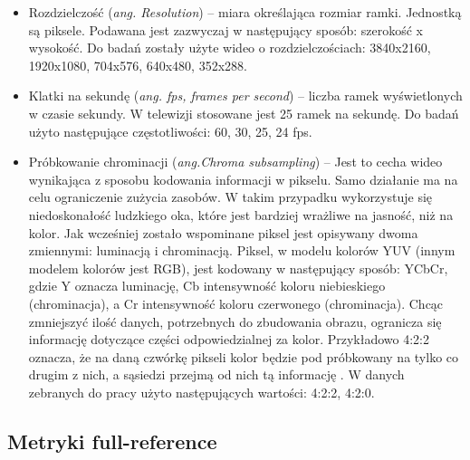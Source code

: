 \begin{itemize}[label=$\bullet$]
\item Rozdzielczość ({\em ang.  Resolution}) -- miara określająca rozmiar ramki. Jednostką są piksele. Podawana jest zazwyczaj w następujący sposób: szerokość x wysokość. Do badań zostały użyte wideo o rozdzielczościach: 3840x2160, 1920x1080, 704x576, 640x480, 352x288. 
\item Klatki na sekundę ({\em ang. fps, frames per second}) -- liczba ramek wyświetlonych w czasie sekundy. W telewizji stosowane jest 25 ramek na sekundę. Do badań użyto następujące częstotliwości: 60, 30, 25, 24 fps.
\item Próbkowanie chrominacji  ({\em ang.Chroma subsampling}) -- Jest to cecha  wideo wynikająca z sposobu kodowania  informacji w pikselu.  Samo działanie ma na celu  ograniczenie zużycia zasobów.  W takim przypadku wykorzystuje się  niedoskonałość ludzkiego oka, które jest bardziej wrażliwe na jasność, niż na kolor. Jak wcześniej zostało wspominane piksel jest opisywany dwoma zmiennymi: luminacją i chrominacją. Piksel, w modelu kolorów YUV (innym modelem kolorów jest RGB),  jest  kodowany w następujący sposób: YCbCr, gdzie Y oznacza luminację, Cb intensywność koloru niebieskiego (chrominacja), a Cr intensywność koloru czerwonego (chrominacja). Chcąc zmniejszyć ilość danych, potrzebnych do zbudowania obrazu, ogranicza się informację dotyczące części odpowiedzialnej za kolor. Przykładowo 4:2:2 oznacza, że na daną czwórkę pikseli kolor będzie pod próbkowany na tylko co drugim z nich, a sąsiedzi przejmą od nich tą informację  \cite{chroma_sampling}. W danych zebranych do pracy użyto następujących wartości: 4:2:2, 4:2:0.
\end{itemize}


\subsection{Metryki full-reference}

